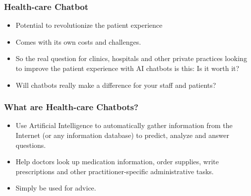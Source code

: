 \begin{frame}[fragile]\frametitle{Health-care Chatbot}

\begin{itemize}
\item  Potential to revolutionize the patient experience
\item Comes with its own costs and challenges.
\item So the real question for clinics, hospitals and other private practices looking to improve the patient experience with AI chatbots is this: Is it worth it?
\item Will chatbots really make a difference for your staff and patients?
\end{itemize}


\end{frame}

\begin{frame}[fragile]\frametitle{What are Health-care Chatbots?}

\begin{itemize}
\item Use Artificial Intelligence to automatically gather information from the Internet (or any information database) to predict, analyze and answer questions.
\item  Help doctors look up medication information, order supplies, write prescriptions and other practitioner-specific administrative tasks. 
\item Simply be used for advice.
\end{itemize}


\end{frame}

